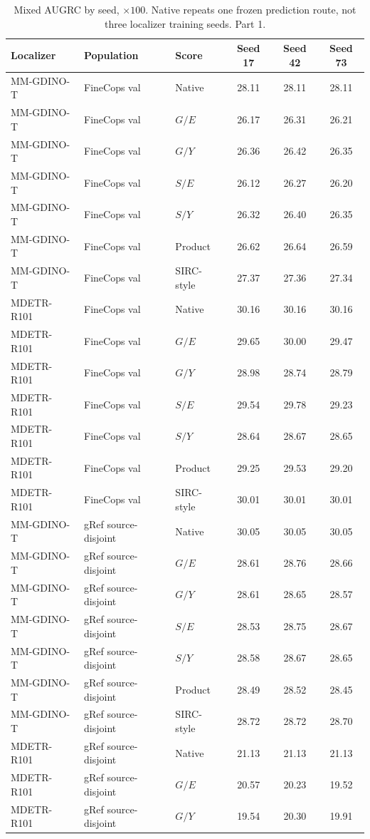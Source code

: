 \begin{table}[t]
\centering\footnotesize
\setlength{\tabcolsep}{3pt}
\renewcommand{\arraystretch}{1.15}
\caption{Mixed AUGRC by seed, $\times100$. Native repeats one frozen prediction route, not three localizer training seeds. Part 1.}\label{tab:supp_v6_seed_endpoints_1}
\begin{tabular}{@{}lllccc@{}}\toprule
Localizer & Population & Score & Seed 17 & Seed 42 & Seed 73\\\midrule
MM-GDINO-T & FineCops val & Native & 28.11 & 28.11 & 28.11\\
MM-GDINO-T & FineCops val & $G/E$ & 26.17 & 26.31 & 26.21\\
MM-GDINO-T & FineCops val & $G/Y$ & 26.36 & 26.42 & 26.35\\
MM-GDINO-T & FineCops val & $S/E$ & 26.12 & 26.27 & 26.20\\
MM-GDINO-T & FineCops val & $S/Y$ & 26.32 & 26.40 & 26.35\\
MM-GDINO-T & FineCops val & Product & 26.62 & 26.64 & 26.59\\
MM-GDINO-T & FineCops val & SIRC-style & 27.37 & 27.36 & 27.34\\
MDETR-R101 & FineCops val & Native & 30.16 & 30.16 & 30.16\\
MDETR-R101 & FineCops val & $G/E$ & 29.65 & 30.00 & 29.47\\
MDETR-R101 & FineCops val & $G/Y$ & 28.98 & 28.74 & 28.79\\
MDETR-R101 & FineCops val & $S/E$ & 29.54 & 29.78 & 29.23\\
MDETR-R101 & FineCops val & $S/Y$ & 28.64 & 28.67 & 28.65\\
MDETR-R101 & FineCops val & Product & 29.25 & 29.53 & 29.20\\
MDETR-R101 & FineCops val & SIRC-style & 30.01 & 30.01 & 30.01\\
MM-GDINO-T & gRef source-disjoint & Native & 30.05 & 30.05 & 30.05\\
MM-GDINO-T & gRef source-disjoint & $G/E$ & 28.61 & 28.76 & 28.66\\
MM-GDINO-T & gRef source-disjoint & $G/Y$ & 28.61 & 28.65 & 28.57\\
MM-GDINO-T & gRef source-disjoint & $S/E$ & 28.53 & 28.75 & 28.67\\
MM-GDINO-T & gRef source-disjoint & $S/Y$ & 28.58 & 28.67 & 28.65\\
MM-GDINO-T & gRef source-disjoint & Product & 28.49 & 28.52 & 28.45\\
MM-GDINO-T & gRef source-disjoint & SIRC-style & 28.72 & 28.72 & 28.70\\
MDETR-R101 & gRef source-disjoint & Native & 21.13 & 21.13 & 21.13\\
MDETR-R101 & gRef source-disjoint & $G/E$ & 20.57 & 20.23 & 19.52\\
MDETR-R101 & gRef source-disjoint & $G/Y$ & 19.54 & 20.30 & 19.91\\
\bottomrule\end{tabular}
\end{table}

